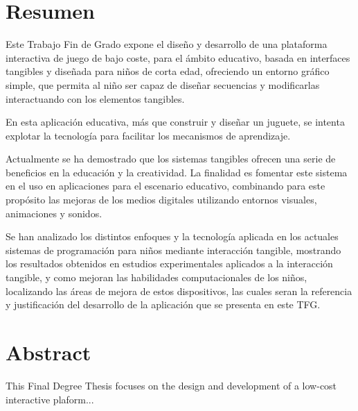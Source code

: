 \chapter{Resumen}
Este Trabajo Fin de Grado expone el diseño y desarrollo de una plataforma
interactiva de juego de bajo coste, para el ámbito educativo, basada en
interfaces tangibles y diseñada para niños de corta edad, ofreciendo un entorno
gráfico simple, que permita al niño ser capaz de diseñar secuencias y
modificarlas interactuando con los elementos tangibles.

En esta aplicación educativa, más que construir y diseñar un juguete, se intenta
explotar la tecnología para facilitar los mecanismos de aprendizaje.

Actualmente se ha demostrado que los sistemas tangibles ofrecen una serie de
beneficios en la educación y la creatividad. La finalidad es fomentar este
sistema en el uso en aplicaciones para el escenario educativo, combinando para
este propósito las mejoras de los medios digitales utilizando entornos
visuales, animaciones y sonidos.

Se han analizado los distintos enfoques y la tecnología aplicada en los actuales
sistemas de programación para niños mediante interacción tangible, mostrando los
resultados obtenidos en estudios experimentales aplicados a la interacción
tangible, y como mejoran las habilidades computacionales de los niños,
localizando las áreas de mejora de estos dispositivos, las cuales seran la
referencia y justificación del desarrollo de la aplicación que se presenta en
este TFG.


\chapter{Abstract}

This Final Degree Thesis focuses on the design and development of a low-cost
interactive plaform...

